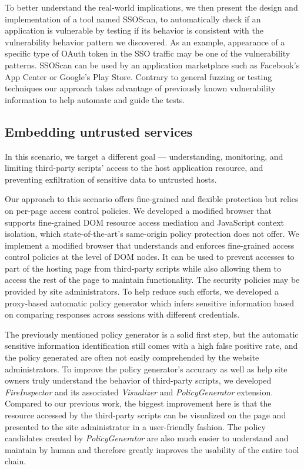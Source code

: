 To better understand the real-world implications, we then present the design and implementation of a tool named SSOScan, to automatically check if an application is vulnerable by testing if its behavior is consistent with the vulnerability behavior pattern we discovered.  As an example, appearance of a specific type of OAuth token in the SSO traffic may be one of the vulnerability patterns.  SSOScan can be used by an application marketplace such as Facebook's App Center or Google's Play Store.  Contrary to general fuzzing or testing techniques our approach takes advantage of previously known vulnerability information to help automate and guide the tests.  

\subsection{Embedding untrusted services} 

In this scenario, we target a different goal --- understanding, monitoring, and limiting third-party scripts' access to the host application resource, and preventing exfiltration of sensitive data to untrusted hosts.

Our approach to this scenario offers fine-grained and flexible protection but relies on per-page access control policies.  We developed a modified browser that supports fine-grained DOM resource access mediation and JavaScript context isolation, which state-of-the-art's same-origin policy protection does not offer.  We implement a modified browser that understands and enforces fine-grained access control policies at the level of DOM nodes.  It can be used to prevent accesses to part of the hosting page from third-party scripts while also allowing them to access the rest of the page to maintain functionality.  The security policies may be provided by site administrators.  To help reduce such efforts, we developed a proxy-based automatic policy generator which infers sensitive information based on comparing responses across sessions with different credentials.

The previously mentioned policy generator is a solid first step, but the automatic sensitive information identification still comes with a high false positive rate, and the policy generated are often not easily comprehended by the website administrators.  To improve the policy generator's accuracy as well as help site owners truly understand the behavior of third-party scripts, we developed \emph{FireInspector} and its associated \emph{Visualizer} and \emph{PolicyGenerator} extension.  Compared to our previous work, the biggest improvement here is that the resource accessed by the third-party scripts can be visualized on the page and presented to the site administrator in a user-friendly fashion.  The policy candidates created by \emph{PolicyGenerator} are also much easier to understand and maintain by human and therefore greatly improves the usability of the entire tool chain.

